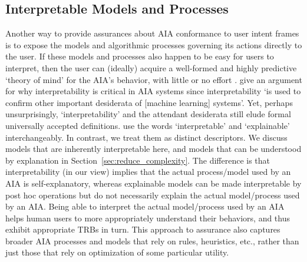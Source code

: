 \subsection{Interpretable Models and Processes} \label{sec:interp_models}
Another way to provide assurances about AIA conformance to user intent frames is to expose the models and algorithmic processes governing its actions directly to the user. If these models and processes also happen to be easy for users to interpret, then the user can (ideally) acquire a well-formed and highly predictive `theory of mind' for the AIA's behavior, with little or no effort . 
\citet{Doshi-Velez2017-xy} give an argument for why interpretability is critical in AIA systems since interpretability `is used to confirm other important desiderata of [machine learning] systems'. 
Yet, perhaps unsurprisingly, `interpretability' and the attendant desiderata still elude formal universally accepted definitions. 
\cite{Doshi-Velez2017-xy} use the words `interpretable' and `explainable' interchangeably. In contrast, we treat them as distinct descriptors. We discuss models that are inherently interpretable here, and models that can be understood by explanation in Section~\ref{sec:reduce_complexity}.  The difference is that interpretability (in our view) implies that the actual process/model used by an AIA is self-explanatory, whereas explainable models can be made interpretable by post hoc operations but do not necessarily explain the actual model/process used by an AIA. 
Being able to interpret the actual model/process used by an AIA helps human users to more appropriately understand their behaviors, and thus exhibit appropriate TRBs in turn. This approach to assurance also captures broader AIA processes and models that rely on rules, heuristics, etc., rather than just those that rely on optimization of some particular utility. 

